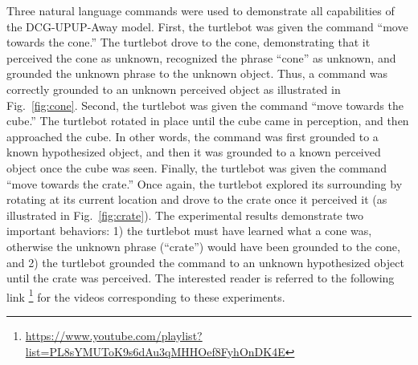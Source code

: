 Three natural language commands were used to demonstrate all capabilities of the DCG-UPUP-Away model.
First, the turtlebot was given the command ``move towards the cone.''
The turtlebot drove to the cone, demonstrating that it perceived the cone as unknown, recognized the phrase ``cone'' as unknown, and grounded the unknown phrase to the unknown object.
Thus, a command was correctly grounded to an unknown perceived object as illustrated in Fig.~\ref{fig:cone}.
Second, the turtlebot was given the command ``move towards the cube.''
The turtlebot rotated in place until the cube came in perception, and then approached the cube.
In other words, the command was first grounded to a known hypothesized object, and then it was grounded to a known perceived object once the cube was seen. 
Finally, the turtlebot was given the command ``move towards the crate.''
Once again, the turtlebot explored its surrounding by rotating at its current location and drove to the crate once it perceived it (as illustrated in Fig.~\ref{fig:crate}). %
The experimental results demonstrate two important behaviors: 1) the turtlebot must have learned what a cone was, otherwise the unknown phrase (``crate'') would have been grounded to the cone, and 2) the turtlebot grounded the command to an unknown hypothesized object until the crate was perceived. The interested reader is referred to the following link \footnote{\url{https://www.youtube.com/playlist?list=PL8sYMUToK9s6dAu3qMHHOef8FyhOnDK4E}} for the videos corresponding to these experiments.

